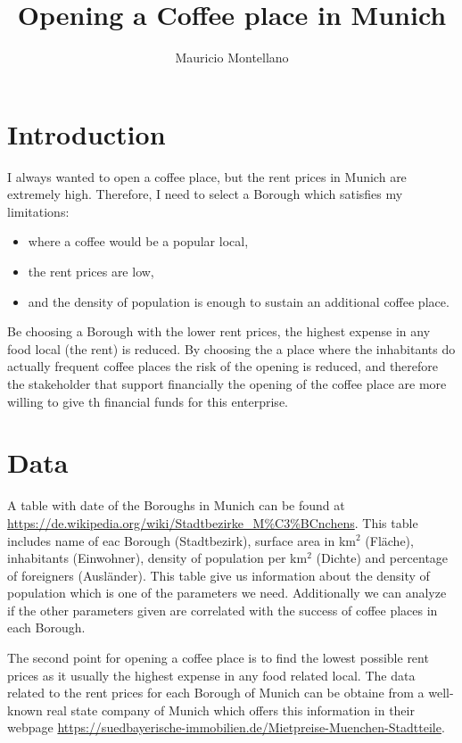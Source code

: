 \documentclass[]{report}
\title{Opening a Coffee place in Munich}
\author{Mauricio Montellano}
\begin{document}
\maketitle

\section*{Introduction}

I always wanted to open a coffee place, but the rent prices in Munich are extremely high. Therefore, I need to select a Borough which satisfies my limitations:


\begin{itemize}
	\item where a coffee would be a popular local,
	\item the rent prices are low,
	\item and the density of population is enough to sustain an additional coffee place.  
\end{itemize}

Be choosing a Borough with the lower rent prices, the highest expense in any food local (the rent) is reduced. By choosing the a place where the inhabitants do actually frequent coffee places the risk of the opening is reduced, and therefore the stakeholder that support financially the opening of the coffee place are more willing to give th financial funds for this enterprise.

\section*{Data}
A table with date of the Boroughs in Munich can be found at \url{https://de.wikipedia.org/wiki/Stadtbezirke_M\%C3\%BCnchens}. This table includes name of eac Borough (Stadtbezirk), surface area in km$^2$ (Fl\"ache), inhabitants (Einwohner), density of population per km$^2$ (Dichte) and percentage of foreigners (Ausl\"ander). This table give us information about the density of population which is one of the parameters we need. Additionally we can analyze if the other parameters given are correlated with the success of coffee places in each Borough.

The second point for opening a coffee place is to find the lowest possible rent prices as it usually the highest expense in any food related local. The data related to the rent prices for each Borough of Munich can be obtaine from a well-known real state company of Munich which offers this information in their webpage \url{https://suedbayerische-immobilien.de/Mietpreise-Muenchen-Stadtteile}.
\end{document}
